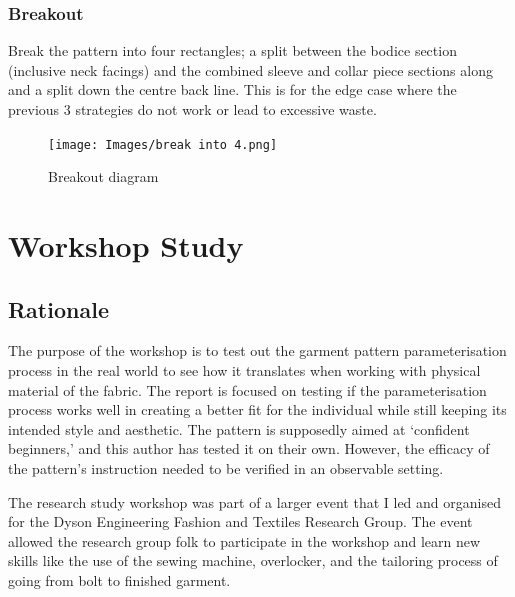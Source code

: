 \subsubsection{Breakout}
Break the pattern into four rectangles; a split between the bodice section (inclusive neck facings) and the combined sleeve and collar piece sections along and a split down the centre back line. This is for the edge case where the previous 3 strategies do not work or lead to excessive waste.
\begin{figure} [H] %
    \centering %
    \texttt{[image: Images/break into 4.png]} %
    \caption{Breakout diagram}
    \label{} %
\end{figure}



\section{Workshop Study}

\subsection{Rationale}
The purpose of the workshop is to test out the garment pattern parameterisation process in the real world to see how it translates when working with physical material of the fabric. The report is focused on testing if the parameterisation process works well in creating a better fit for the individual while still keeping its intended style and aesthetic. The pattern is supposedly aimed at ‘confident beginners,’ and this author has tested it on their own. However, the efficacy of the pattern’s instruction needed to be verified in an observable setting. 

The research study workshop was part of a larger event that I led and organised for the Dyson Engineering Fashion and Textiles Research Group. The event allowed the research group folk to participate in the workshop and learn new skills like the use of the sewing machine, overlocker, and the tailoring process of going from bolt to finished garment.


